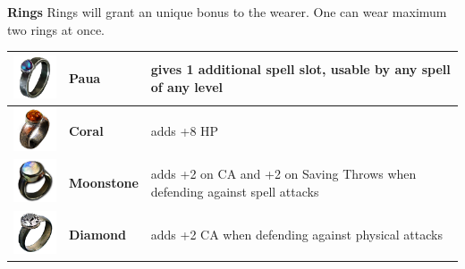 \textbf{Rings} Rings will grant an unique bonus to the wearer. One can wear maximum two rings at once. \\

\begin{tabular}{m{2cm}m{3cm}m{5cm} } \hline
	\includegraphics[width=2cm]{../Pictures/Gameplay/Items/Wearables/Rings/Paua_ring_icon.png} & \textbf{Paua} & gives 1 additional spell slot, usable by any spell of any level \\ \hline
	\includegraphics[width=2cm]{../Pictures/Gameplay/Items/Wearables/Rings/Coral_ring_icon.png} & \textbf{Coral} & adds +8 HP \\ \hline
	\includegraphics[width=2cm]{../Pictures/Gameplay/Items/Wearables/Rings/Moonstone_ring_icon.png} & \textbf{Moonstone} & adds +2 on CA and +2 on Saving Throws when defending against spell attacks \\ \hline
	\includegraphics[width=2cm]{../Pictures/Gameplay/Items/Wearables/Rings/Diamond_ring_icon.png} & \textbf{Diamond} & adds +2 CA when defending against physical attacks \\ \hline
\end{tabular}

\pagebreak 